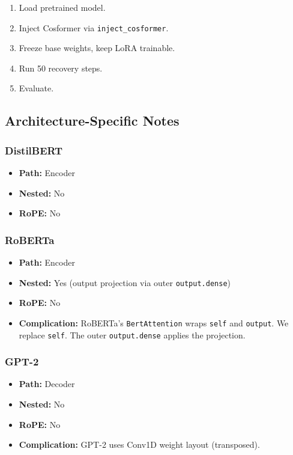 \begin{enumerate}
\item Load pretrained model.
\item Inject Cosformer via \texttt{inject\_cosformer}.
\item Freeze base weights, keep LoRA trainable.
\item Run 50 recovery steps.
\item Evaluate.

\end{enumerate}
\subsection{Architecture-Specific Notes}

\subsubsection{DistilBERT}

\begin{itemize}
\item \textbf{Path:} Encoder
\item \textbf{Nested:} No
\item \textbf{RoPE:} No

\end{itemize}
\subsubsection{RoBERTa}

\begin{itemize}
\item \textbf{Path:} Encoder
\item \textbf{Nested:} Yes (output projection via outer \texttt{output.dense})
\item \textbf{RoPE:} No
\item \textbf{Complication:} RoBERTa's \texttt{BertAttention} wraps \texttt{self} and \texttt{output}. We
  replace \texttt{self}. The outer \texttt{output.dense} applies the projection.

\end{itemize}
\subsubsection{GPT-2}

\begin{itemize}
\item \textbf{Path:} Decoder
\item \textbf{Nested:} No
\item \textbf{RoPE:} No
\item \textbf{Complication:} GPT-2 uses Conv1D weight layout (transposed).

\end{itemize}
